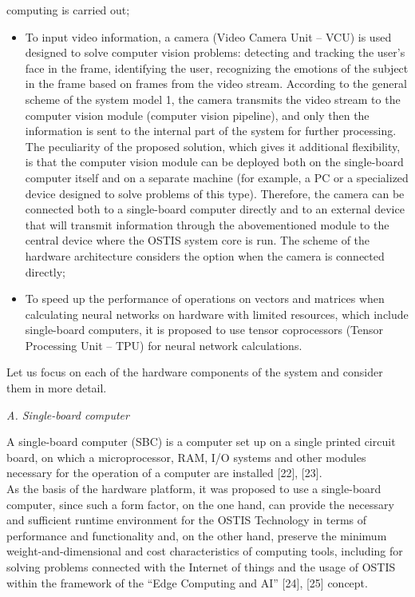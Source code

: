 \documentclass[10pt,twocolumn]{article}
\begin{document}
\small
{\setlength{\parindent}{0.3in} computing is carried out;}
\begin{itemize}
    \item To input video information, a camera 
(Video Camera Unit – VCU) is used designed to solve 
computer vision problems: detecting and tracking the user’s
face in the frame, identifying the user, recognizing
the emotions of the subject in the frame based on
frames from the video stream. According to the
general scheme of the system model 1, the camera
transmits the video stream to the computer vision
module (computer vision pipeline), and only then
the information is sent to the internal part of the
system for further processing. The peculiarity of
the proposed solution, which gives it additional
flexibility, is that the computer vision module can
be deployed both on the single-board computer itself
and on a separate machine (for example, a PC or
a specialized device designed to solve problems of
this type). Therefore, the camera can be connected
both to a single-board computer directly and to
an external device that will transmit information
through the abovementioned module to the central
device where the OSTIS system core is run. The
scheme of the hardware architecture considers the
option when the camera is connected directly;
    \item To speed up the performance of
operations on vectors and matrices when calculating neural networks
on hardware with limited resources, which include
single-board computers, it is proposed to use tensor
coprocessors (Tensor Processing Unit – TPU) for
neural network calculations.
\end{itemize}
Let us focus on each of the hardware components of
the system and consider them in more detail.

\setlength{\parskip}{-0.1cm}

\begin{flushleft}
\textit{A. Single-board computer}
\end{flushleft}

A single-board computer (SBC) is a computer set up
on a single printed circuit board, on which a microprocessor, RAM, I/O systems and other modules necessary for the operation of a computer are installed [22], [23].\\

As the basis of the hardware platform, it was proposed
to use a single-board computer, since such a form factor,
on the one hand, can provide the necessary and sufficient
runtime environment for the OSTIS Technology in terms
of performance and functionality and, on the other hand,
preserve the minimum weight-and-dimensional and cost
characteristics of computing tools, including for solving
problems connected with the Internet of things and the
usage of OSTIS within the framework of the “Edge
Computing and AI” [24], [25] concept.\\
\end{document}
